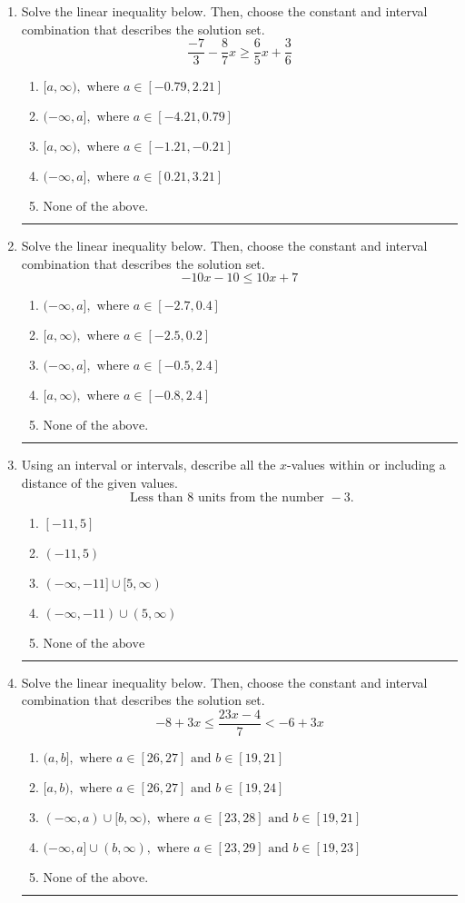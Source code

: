\documentclass[14pt]{extbook}
\newcommand{\litem}[1]{\item#1\hspace*{-1cm}\rule{\textwidth}{0.4pt}}
\begin{document}
\begin{enumerate}
{\begin{enumerate}[label=\Alph*.]
\end{enumerate} }
\litem{
Solve the linear inequality below. Then, choose the constant and interval combination that describes the solution set.\[ \frac{-7}{3} - \frac{8}{7} x \geq \frac{6}{5} x + \frac{3}{6} \]\begin{enumerate}[label=\Alph*.]
\item \( [a, \infty), \text{ where } a \in [-0.79, 2.21] \)
\item \( (-\infty, a], \text{ where } a \in [-4.21, 0.79] \)
\item \( [a, \infty), \text{ where } a \in [-1.21, -0.21] \)
\item \( (-\infty, a], \text{ where } a \in [0.21, 3.21] \)
\item \( \text{None of the above}. \)

\end{enumerate} }
\litem{
Solve the linear inequality below. Then, choose the constant and interval combination that describes the solution set.\[ -10x -10 \leq 10x + 7 \]\begin{enumerate}[label=\Alph*.]
\item \( (-\infty, a], \text{ where } a \in [-2.7, 0.4] \)
\item \( [a, \infty), \text{ where } a \in [-2.5, 0.2] \)
\item \( (-\infty, a], \text{ where } a \in [-0.5, 2.4] \)
\item \( [a, \infty), \text{ where } a \in [-0.8, 2.4] \)
\item \( \text{None of the above}. \)

\end{enumerate} }
\litem{
Using an interval or intervals, describe all the $x$-values within or including a distance of the given values.\[ \text{ Less than } 8 \text{ units from the number } -3. \]\begin{enumerate}[label=\Alph*.]
\item \( [-11, 5] \)
\item \( (-11, 5) \)
\item \( (-\infty, -11] \cup [5, \infty) \)
\item \( (-\infty, -11) \cup (5, \infty) \)
\item \( \text{None of the above} \)

\end{enumerate} }
\litem{
Solve the linear inequality below. Then, choose the constant and interval combination that describes the solution set.\[ -8 + 3 x \leq \frac{23 x - 4}{7} < -6 + 3 x \]\begin{enumerate}[label=\Alph*.]
\item \( (a, b], \text{ where } a \in [26, 27] \text{ and } b \in [19, 21] \)
\item \( [a, b), \text{ where } a \in [26, 27] \text{ and } b \in [19, 24] \)
\item \( (-\infty, a) \cup [b, \infty), \text{ where } a \in [23, 28] \text{ and } b \in [19, 21] \)
\item \( (-\infty, a] \cup (b, \infty), \text{ where } a \in [23, 29] \text{ and } b \in [19, 23] \)
\item \( \text{None of the above.} \)


\end{enumerate}}
\end{enumerate}
\end{document}
